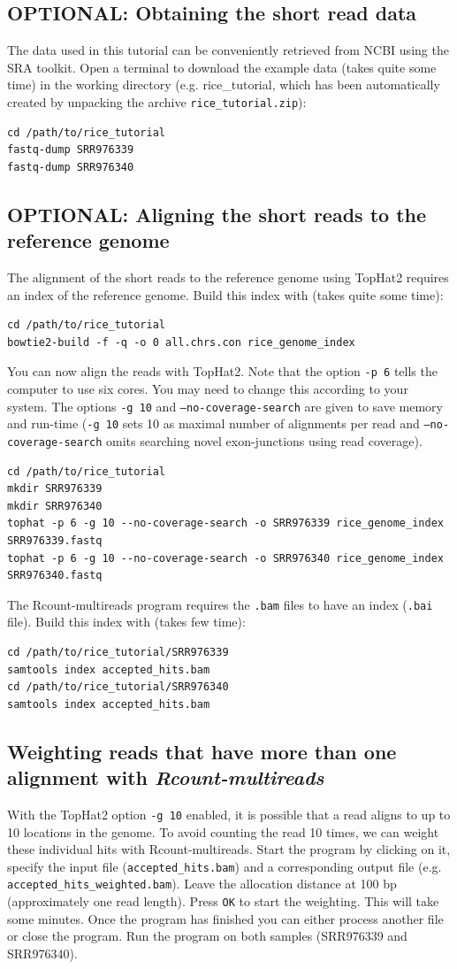 \documentclass[a4paper,10pt]{article}
\begin{document}
\subsection{OPTIONAL: Obtaining the short read data}
The data used in this tutorial can be conveniently retrieved from NCBI using the SRA toolkit. Open a terminal to download the example data (takes quite some time) in the working directory (e.g. rice\_tutorial, which has been automatically created by unpacking the archive \texttt{rice\_tutorial.zip}):
\begin{verbatim}
cd /path/to/rice_tutorial
fastq-dump SRR976339
fastq-dump SRR976340
\end{verbatim}
\subsection{OPTIONAL: Aligning the short reads to the reference genome}
The alignment of the short reads to the reference genome using TopHat2 requires an index of the reference genome. Build this index with (takes quite some time):
\begin{verbatim}
cd /path/to/rice_tutorial
bowtie2-build -f -q -o 0 all.chrs.con rice_genome_index
\end{verbatim}
You can now align the reads with TopHat2. Note that the option \texttt{-p 6} tells the computer to use six cores. You may need to change this according to your system. The options \texttt{-g 10} and \texttt{--no-coverage-search} are given to save memory and run-time (\texttt{-g 10} sets 10 as maximal number of alignments per read and \texttt{--no-coverage-search} omits searching novel exon-junctions using read coverage).
\begin{verbatim}
cd /path/to/rice_tutorial
mkdir SRR976339
mkdir SRR976340
tophat -p 6 -g 10 --no-coverage-search -o SRR976339 rice_genome_index SRR976339.fastq
tophat -p 6 -g 10 --no-coverage-search -o SRR976340 rice_genome_index SRR976340.fastq
\end{verbatim}
The Rcount-multireads program requires the \texttt{.bam} files to have an index (\texttt{.bai} file). Build this index with (takes few time):
\begin{verbatim}
cd /path/to/rice_tutorial/SRR976339
samtools index accepted_hits.bam
cd /path/to/rice_tutorial/SRR976340
samtools index accepted_hits.bam
\end{verbatim}
\subsection{Weighting reads that have more than one alignment with \textit{Rcount-multireads}}\label{usePrePro}
With the TopHat2 option \texttt{-g 10} enabled, it is possible that a read aligns to up to 10 locations in the genome. To avoid counting the read 10 times, we can weight these individual hits with Rcount-multireads. Start the program by clicking on it, specify the input file (\texttt{accepted\_hits.bam}) and a corresponding output file (e.g. \texttt{accepted\_hits\_weighted.bam}). Leave the allocation distance at 100 bp (approximately one read length). Press \texttt{OK} to start the weighting. This will take some minutes. Once the program has finished you can either process another file or close the program. Run the program on both samples (SRR976339 and SRR976340).
\end{document}
